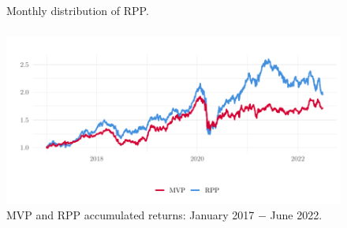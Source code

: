 \begin{frame}[t]
	\begin{figure}[H]
		\begin{adjustwidth}{1cm}{1cm}
			\begin{subfigmatrix}{2}
			\end{subfigmatrix}
			\caption{Monthly distribution of RPP.}
			\label{fig:totalRiskPPP}
		\end{adjustwidth}
	\end{figure}
\end{frame}

\begin{frame}[t]\frametitle{}\bigskip

	\begin{figure}[H]
		\centering
		\includegraphics[width=0.7\linewidth]{../figures/retornovolHighLow.pdf}
		\caption{MVP and RPP accumulated returns: January 2017 $-$ June 2022.}
		\label{fig:retornoRPPMVP}
	\end{figure}


	

\end{frame}

